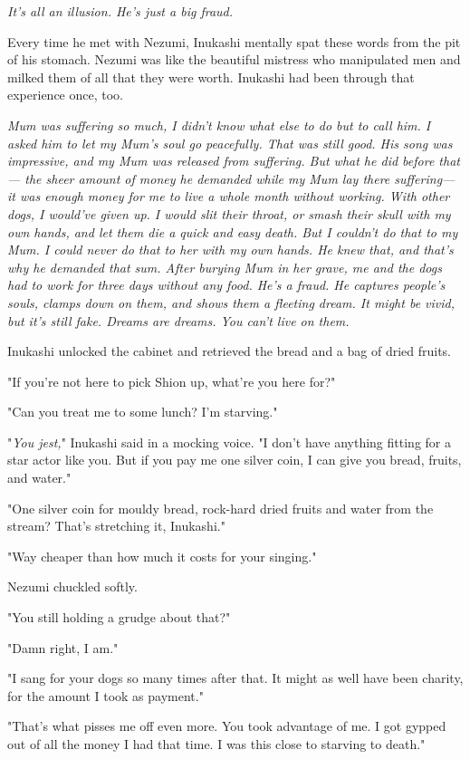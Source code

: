 \emph{It's all an illusion. He's just a big fraud.}

Every time he met with Nezumi, Inukashi mentally spat these words from
the pit of his stomach. Nezumi was like the beautiful mistress who
manipulated men and milked them of all that they were worth. Inukashi
had been through that experience once, too.

\emph{Mum was suffering so much, I didn't know what else to do but to call
him. I asked him to let my Mum's soul go peacefully. That was still
good. His song was impressive, and my Mum was released from suffering.
But what he did before that--- the sheer amount of money he demanded while
my Mum lay there suffering--- it was enough money for me to live a whole
month without working. With other dogs, I would've given up. I would
slit their throat, or smash their skull with my own hands, and let them
die a quick and easy death. But I couldn't do that to my Mum. I could
never do that to her with my own hands. He knew that, and that's why he
demanded that sum. After burying Mum in her grave, me and the dogs had
to work for three days without any food. He's a fraud. He captures
people's souls, clamps down on them, and shows them a fleeting dream. It
might be vivid, but it's still fake. Dreams are dreams. You can't live
on them.}

Inukashi unlocked the cabinet and retrieved the bread and a bag of dried
fruits.

"If you're not here to pick Shion up, what're you here for?"

"Can you treat me to some lunch? I'm starving."

"\emph{You jest,}" Inukashi said in a mocking voice. "I don't have anything
fitting for a star actor like you. But if you pay me one silver coin, I
can give you bread, fruits, and water."

"One silver coin for mouldy bread, rock-hard dried fruits and water from
the stream? That's stretching it, Inukashi."

"Way cheaper than how much it costs for your singing."

Nezumi chuckled softly.

"You still holding a grudge about that?"

"Damn right, I am."

"I sang for your dogs so many times after that. It might as well have
been charity, for the amount I took as payment."

"That's what pisses me off even more. You took advantage of me. I got
gypped out of all the money I had that time. I was this close to
starving to death."

